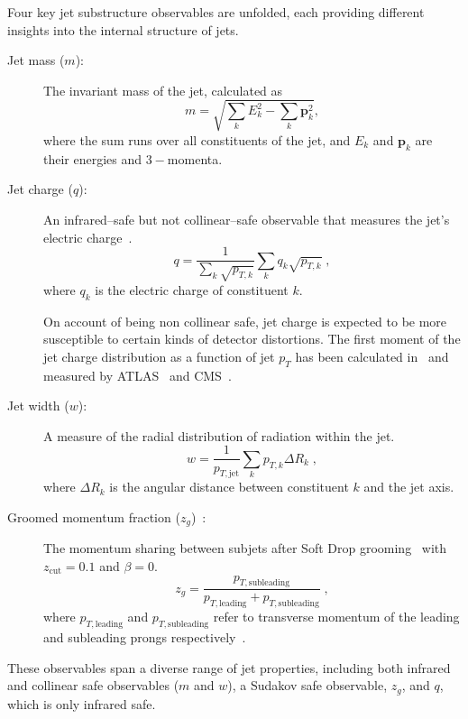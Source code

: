                 Four key jet substructure observables are unfolded, each providing different insights into the internal structure of jets.
                \begin{description}
                \item[Jet mass ($m$):] The invariant mass of the jet, calculated as
                \[
                    m = \sqrt{\sum_k E_k^2 - \sum_k \mathbf{p}_k^2},
                \]
                where the sum runs over all constituents of the jet, and $E_k$ and $\mathbf{p}_k$ are their energies and \(3-\)momenta.
            \item[Jet charge ($q$):] An infrared--safe but not collinear--safe observable that measures the jet's electric charge~\cite{Kang:2023ptt, ATLAS:2015rlw}.
            \[
                q = \frac{1}{\sum_k \sqrt{p_{T,k}}}\sum_k q_k \sqrt{p_{T,k}}\;,
            \]
            where $q_k$ is the electric charge of constituent $k$.
            
            On account of being non collinear safe, jet charge is expected to be more susceptible to certain kinds of detector distortions.
            The first moment of the jet charge distribution as a function of jet $p_T$ has been calculated in~\cite{Krohn2013JetLHC,Waalewijn2012CalculatingJet,Li:2019dre,Li2020JetMatter,Kang2020JetCollider} and measured by ATLAS~\cite{ATLAS:2015rlw} and CMS~\cite{CMS:2017yer,CMS:2020plq}.
            \item [Jet width ($w$):] A measure of the radial distribution of radiation within the jet.
            \[
                w = \frac{1}{p_{T,\text{jet}}}\sum_k p_{T,k} \Delta R_k\;,
            \]
            where $\Delta R_k$ is the angular distance between constituent $k$ and the jet axis.
            \item [Groomed momentum fraction ($z_g$)~\cite{Larkoski:2015lea}:] The momentum sharing between subjets after Soft Drop grooming~\cite{Dasgupta2013TowardsSubstructure, Larkoski2014SoftDrop} with $z_{\text{cut}} = 0.1$ and $\beta = 0$.
            \[
                z_g = \frac{p_{T,\text{subleading}}}{p_{T,\text{leading}} + p_{T,\text{subleading}}}\;,
            \]
            where \(p_{T,\text{leading}}\) and \(p_{T,\text{subleading}}\) refer to transverse momentum of the leading and subleading prongs respectively~\cite{ALargeIonColliderExperiment:2021mqf}.
            \end{description}
            
            These observables span a diverse range of jet properties, including both infrared and collinear safe observables ($m$ and $w$), a Sudakov safe observable, \(z_g\), and \(q\), which is only infrared safe.

